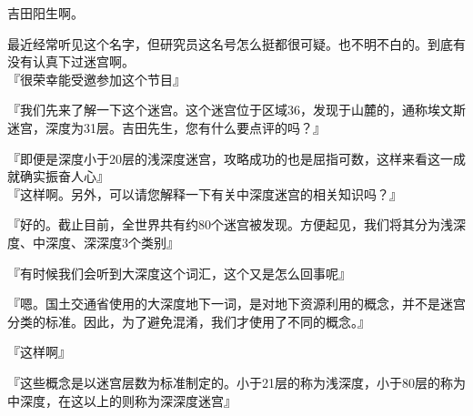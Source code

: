 吉田阳生啊。

最近经常听见这个名字，但研究员这名号怎么挺都很可疑。也不明不白的。到底有没有认真下过迷宫啊。\\

『很荣幸能受邀参加这个节目』

『我们先来了解一下这个迷宫。这个迷宫位于区域36，发现于山麓的，通称埃文斯迷宫，深度为31层。吉田先生，您有什么要点评的吗？』

『即便是深度小于20层的浅深度迷宫，攻略成功的也是屈指可数，这样来看这一成就确实振奋人心』\\

『这样啊。另外，可以请您解释一下有关中深度迷宫的相关知识吗？』

『好的。截止目前，全世界共有约80个迷宫被发现。方便起见，我们将其分为浅深度、中深度、深深度3个类别』

『有时候我们会听到大深度这个词汇，这个又是怎么回事呢』

『嗯。国土交通省使用的大深度地下一词，是对地下资源利用的概念，并不是迷宫分类的标准。因此，为了避免混淆，我们才使用了不同的概念。』

『这样啊』

『这些概念是以迷宫层数为标准制定的。小于21层的称为浅深度，小于80层的称为中深度，在这以上的则称为深深度迷宫』\\

